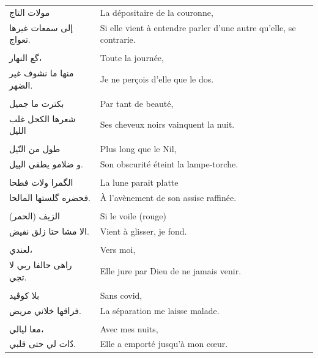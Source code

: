 \begin{longtable}{R{0.3\textwidth} L{0.65\textwidth}}
\\
\textarabic{مولات التاج}                  &       La dépositaire de la couronne,   \\
\textarabic{إلى سمعات غيرها تعواج.}      &       Si elle vient à entendre parler d’une autre qu’elle, se contrarie.   \\
\\
\textarabic{گع النهار،}                  &       Toute la journée,   \\
\textarabic{منها ما نشوف غير الضهر.}     &       Je ne perçois d’elle que le dos.   \\
\\
\textarabic{بكترت ما جميل}               &       Par tant de beauté,   \\
\textarabic{شعرها الكحل غلب الليل}       &       Ses cheveux noirs vainquent la nuit.   \\
\\
\textarabic{طول من النّيل}                &       Plus long que le Nil,   \\
\textarabic{و ضلامو يطفي الپيل.}          &       Son obscurité éteint la lampe-torche.   \\
\\
\textarabic{الگمرا ولات فطحا}             &       La lune parait platte  \\
\textarabic{فحضره گلستها المالحا.}       &       À l’avènement de son assise raffinée.   \\
\\
\textarabic{الزيف  (الحمر)}         &       Si le voile  (rouge)   \\
\textarabic{الا مشا حتا زلق نفيض.}        &       Vient à glisser, je fond.   \\
\\
\textarabic{لعندي،}                      &       Vers moi,   \\
\textarabic{راهى حالفا ربي لا تجي.}       &       Elle jure par Dieu de ne jamais venir.   \\
\\
\textarabic{بلا كوڤيد}                    &       Sans covid,   \\
\textarabic{فراقها خلاني مريض.}            &       La séparation me laisse malade. \\
\\
\textarabic{معا ليالي،}                  &       Avec mes nuits,   \\
\textarabic{دّات لي حتى قلبي.}            &       Elle a emporté jusqu’à mon cœur.   \\

\end{longtable}
